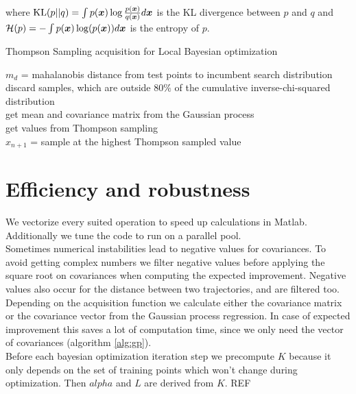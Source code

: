 where $\mathrm{KL}(p||q) = \int p({\boldsymbol{x}}) \log \frac{p({\boldsymbol{x}})}{q({\boldsymbol{x}})} d{\boldsymbol{x}}$ is the KL divergence between $p$ and $q$ and ${\cal H}(p) = -\int p({\boldsymbol{x}})\log(p({\boldsymbol{x}})) d{\boldsymbol{x}}$ is the entropy of $p$.

\begin{algorithm}
    \caption{Thompson Sampling acquisition for Local Bayesian optimization\label{alg:acqLocalBO}}
    \BlankLine

    $m_d$ = mahalanobis distance from test points to incumbent search distribution\\
    discard samples, which are outside $80\%$ of the cumulative inverse-chi-squared distribution\\
    get mean and covariance matrix from the Gaussian process\\
    get values from Thompson sampling\\
    $x_{n+1}$ = sample at the highest Thompson sampled value\\
\end{algorithm}


\section{Efficiency and robustness}
We vectorize every suited operation to speed up calculations in Matlab. Additionally we tune the code to run on a parallel pool.\\

Sometimes numerical instabilities lead to negative values for covariances. To avoid getting complex numbers we filter negative values before applying the square root on covariances when computing the expected improvement. Negative values also occur for the distance between two trajectories, and are filtered too.\\

Depending on the acquisition function we calculate either the covariance matrix or the covariance vector from the Gaussian process regression. In case of expected improvement this saves a lot of computation time, since we only need the vector of covariances (algorithm \ref{alg:gp}). \\

Before each bayesian optimization iteration step we precompute $K$ because it only depends on the set of training points which won't change during optimization. Then $alpha$ and $L$ are derived from $K$. REF

